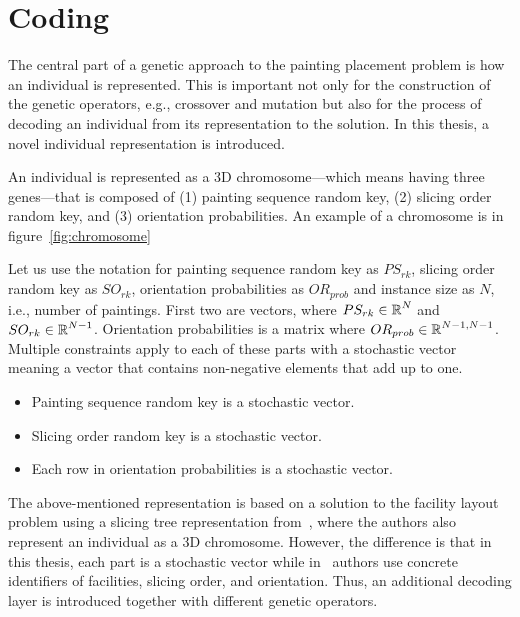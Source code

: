 \section{Coding}\label{sec:coding}

The central part of a genetic approach to the painting placement problem is how an individual is represented.
This is important not only for the construction of the genetic operators, e.g., crossover and mutation but also for the process of decoding an individual from its representation to the solution.
In this thesis, a novel individual representation is introduced.

An individual is represented as a 3D chromosome—which means having three genes—that is composed of
(1) painting sequence random key, (2) slicing order random key, and (3) orientation probabilities.
An example of a chromosome is in figure~\ref{fig:chromosome}

Let us use the notation for painting sequence random key as $PS_{rk}$,
slicing order random key as $SO_{rk}$,
orientation probabilities as $OR_{prob}$ and instance size as $N$, i.e., number of paintings.
First two are vectors, where $PS_{rk} \in \operatorname*{\mathbb{R}}^N$ and $SO_{rk} \in \operatorname*{\mathbb{R}}^{N-1}$.
Orientation probabilities is a matrix where $OR_{prob} \in \operatorname*{\mathbb{R}}^{N-1, N-1}$.
Multiple constraints apply to each of these parts with
a stochastic vector meaning a vector that contains non-negative elements that add up to one.

\begin{itemize}
    \item Painting sequence random key is a stochastic vector.
    \item Slicing order random key is a stochastic vector.
    \item Each row in orientation probabilities is a stochastic vector.
\end{itemize}


The above-mentioned representation is based on a solution to the facility layout problem using a slicing tree representation
from~\cite{friedrichIntegratedSlicingTree2018, riponAdaptiveVariableNeighborhood2013},
where the authors also represent an individual as a 3D chromosome.
However, the difference is that in this thesis, each part is a stochastic vector while
in~\cite{friedrichIntegratedSlicingTree2018, riponAdaptiveVariableNeighborhood2013} authors use concrete identifiers of facilities, slicing order, and orientation.
Thus, an additional decoding layer is introduced together with different genetic operators.

